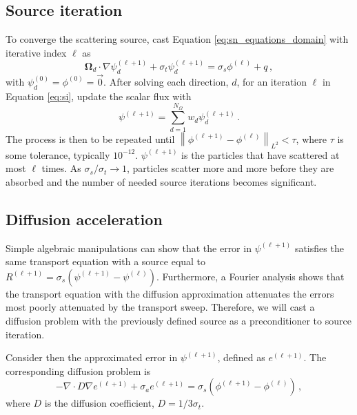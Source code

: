 \documentclass{article}
\newcommand{\vo}{\mathbf{\Omega}} %
\begin{document}
\subsection{Source iteration}
\label{subsec:SI}

To converge the scattering source, cast Equation \eqref{eq:sn_equations_domain} with iterative index $\ell$ as
\begin{equation}
	\label{eq:si}
\vo_d \cdot \nabla \psi_d^{(\ell + 1)} + \sigma_t \psi_d^{(\ell + 1)} = \sigma_s \phi^{(\ell)} + q\,,
\end{equation}
with $\psi_d^{(0)} = \phi^{(0)} = \vec{0}$. After solving each direction, $d$, for an iteration $\ell$ in Equation \eqref{eq:si}, update the scalar flux with
\begin{equation}
	\label{eq:si_update}
	\psi^{(\ell + 1)} = \sum_{d = 1}^{N_\Omega} w_d \psi_d^{(\ell + 1)}\,.
\end{equation}
The process is then to be repeated until $\left\lVert\phi^{(\ell + 1)} - \phi^{(\ell)}\right\rVert_{L^2} < \tau$, where $\tau$ is some tolerance, typically $10^{-12}$. $\psi^{(\ell + 1)}$ is the particles that have scattered at most $\ell$ times. As $\sigma_s / \sigma_t \to 1$, particles scatter more and more before they are absorbed and the number of needed source iterations becomes significant.

\subsection{Diffusion acceleration}

Simple algebraic manipulations can show that the error in $\psi^{(\ell + 1)}$ satisfies the same transport equation with a source equal to $R^{(\ell + 1)} = \sigma_s (\psi^{(\ell + 1)} - \psi^{(\ell)})$. Furthermore, a Fourier analysis shows that the transport equation with the diffusion approximation attenuates the errors most poorly attenuated by the transport sweep. Therefore, we will cast a diffusion problem with the previously defined source as a preconditioner to source iteration.
	
Consider then the approximated error in $\psi^{(\ell + 1)}$, defined as $e^{(\ell + 1)}$. The corresponding diffusion problem is
\begin{equation}
	\label{eq:diffusion}
	- \nabla \cdot D \nabla e^{(\ell + 1)} + \sigma_a e^{(\ell + 1)} = \sigma_s (\phi^{(\ell + 1)} - \phi^{(\ell)})\,,
\end{equation}
where $D$ is the diffusion coefficient, $D = 1 / 3 \sigma_t$.
\end{document}
